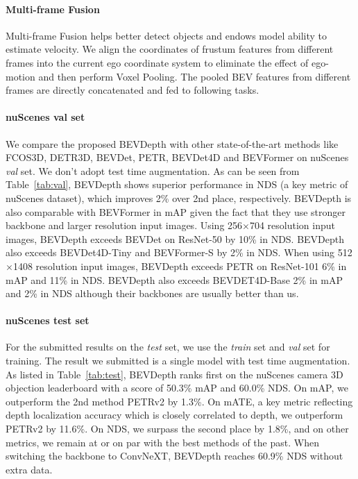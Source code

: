 \documentclass[twocolumn,letterpaper]{article}
\begin{document}
\paragraph{Multi-frame Fusion} Multi-frame Fusion helps better detect objects and endows model ability to estimate velocity. We align the coordinates of frustum features from different frames into the current ego coordinate system to eliminate the effect of ego-motion and then perform Voxel Pooling. The pooled BEV features from different frames are directly concatenated and fed to following tasks.

\paragraph{nuScenes val set}We compare the proposed BEVDepth with other state-of-the-art methods like FCOS3D, DETR3D, BEVDet, PETR, BEVDet4D and BEVFormer on nuScenes \emph{val} set. We don't adopt test time augmentation. As can be seen from Table~\ref{tab:val}, BEVDepth shows superior performance in NDS (a key metric of nuScenes dataset), which improves 2\% over 2nd place, respectively. BEVDepth is also comparable with BEVFormer in mAP given the fact that they use stronger backbone and larger resolution input images. Using 256$\times$704 resolution input images, BEVDepth exceeds BEVDet on ResNet-50 by 10\% in NDS. BEVDepth also exceeds BEVDet4D-Tiny and BEVFormer-S by 2\% in NDS. When using 512$\times$1408 resolution input images, BEVDepth exceeds PETR on ResNet-101 6\% in mAP and 11\% in NDS. BEVDepth also exceeds BEVDET4D-Base 2\% in mAP and 2\% in NDS although their backbones are usually better than us.


\paragraph{nuScenes test set} For the submitted results on the \emph{test} set, we use the \emph{train} set and \emph{val} set for training. The result we submitted is a single model with test time augmentation. As listed in Table~\ref{tab:test}, BEVDepth ranks first on the nuScenes camera 3D objection leaderboard with a score of 50.3\% mAP and 60.0\% NDS. On mAP, we outperform the 2nd method PETRv2 by 1.3\%. On mATE, a key metric reflecting depth localization accuracy which is closely correlated to depth, we outperform PETRv2 by 11.6\%. On NDS, we surpass the second place by 1.8\%, and on other metrics, we remain at or on par with the best methods of the past. When switching the backbone to ConvNeXT, BEVDepth reaches 60.9\% NDS without extra data.
\end{document}

